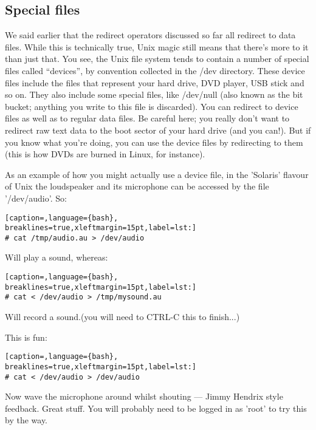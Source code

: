 \subsection{Special files}
We said earlier that the redirect operators discussed so far all redirect to
data files. While this is technically true, Unix magic still means that there's
more to it than just that. You see, the Unix file system tends to contain a
number of special files called ``devices'', by convention collected in the /dev
directory. These device files include the files that represent your hard drive,
DVD player, USB stick and so on. They also include some special files, like
/dev/null (also known as the bit bucket; anything you write to this file is
discarded). You can redirect to device files as well as to regular data files.
Be careful here; you really don't want to redirect raw text data to the boot
sector of your hard drive (and you can!). But if you know what you're doing,
you can use the device files by redirecting to them (this is how DVDs are
burned in Linux, for instance).

As an example of how you might actually use a device file, in the 'Solaris'
flavour of Unix the loudspeaker and its microphone can be accessed by the file
'/dev/audio'. So:
\lstset{basicstyle=\scriptsize, numbers=left, captionpos=b, tabsize=4}
\begin{lstlisting}[caption=,language={bash},
breaklines=true,xleftmargin=15pt,label=lst:]
# cat /tmp/audio.au > /dev/audio
\end{lstlisting}

Will play a sound, whereas:

\lstset{basicstyle=\scriptsize, numbers=left, captionpos=b, tabsize=4}
\begin{lstlisting}[caption=,language={bash},
breaklines=true,xleftmargin=15pt,label=lst:]
# cat < /dev/audio > /tmp/mysound.au
\end{lstlisting}

Will record a sound.(you will need to CTRL-C this to finish...)

This is fun:
\lstset{basicstyle=\scriptsize, numbers=left, captionpos=b, tabsize=4}
\begin{lstlisting}[caption=,language={bash},
breaklines=true,xleftmargin=15pt,label=lst:]
# cat < /dev/audio > /dev/audio
\end{lstlisting}
Now wave the microphone around whilst shouting --- Jimmy Hendrix style
feedback. Great stuff.  You will probably need to be logged in as 'root' to try
this by the way.

